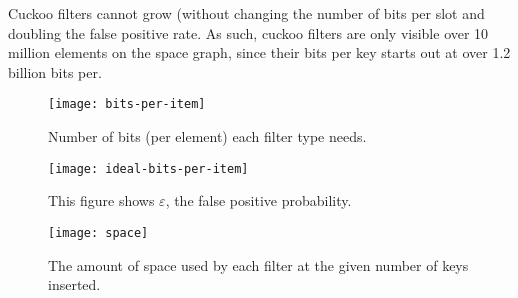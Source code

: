 \documentclass[manuscript,screen,review]{acmart}
\begin{document}
Cuckoo filters cannot grow (without changing the number of bits per slot and doubling the false positive rate.
As such, cuckoo filters are only visible over 10 million elements on the space graph, since their bits per key starts out at over 1.2 billion bits per.






\begin{figure}

  \texttt{[image: bits-per-item]}
  \caption{  \label{bits-per-item}
Number of bits (per element) each filter type needs.}
\end{figure}

\begin{figure}
  \texttt{[image: ideal-bits-per-item]}
  \caption{  \label{ideal-bits-per-item}
This figure shows $\varepsilon$, the false positive probability.}
\end{figure}




\begin{figure}
  \texttt{[image: space]}
  \caption{
    The amount of space used by each filter at the given number of keys inserted.
  }
\end{figure}
\end{document}
